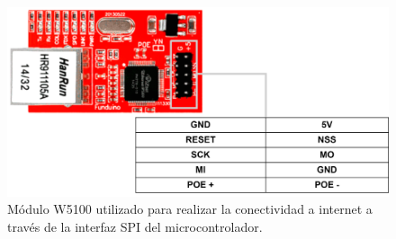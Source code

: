 \begin{figure}[H]
    \centering
    \includegraphics[width=0.7\linewidth]{Figuras/datalogger/Hardware/moduleW5100.png}
    \caption{Módulo W5100 utilizado para realizar la conectividad a internet a través de la interfaz SPI del microcontrolador.}
    \label{fig:moduleW5100}
\end{figure}

